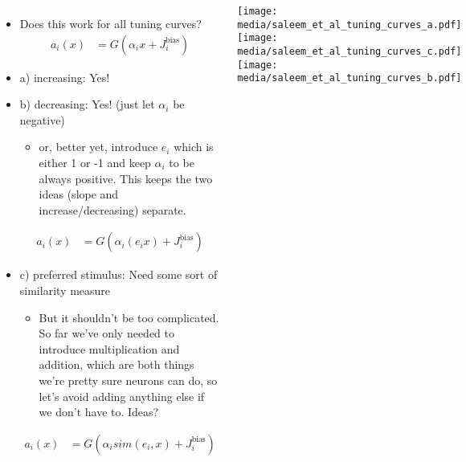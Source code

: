 \documentclass[handout,aspectratio=169]{beamer}
\begin{document}
\begin{frame}
	\begin{columns}
		\begin{itemize}
			\item Does this work for all tuning curves?
			\vspace*{-0.3cm}			
			\begin{align*}
				a_i(x) &= G(\alpha_i x + J^\mathrm{bias}_i)			
			\end{align*}			
			\item<2-> a) increasing: Yes!
			\item<3-> b) decreasing: Yes! (just let $\alpha_i$ be negative)
			\begin{itemize}
			\item or, better yet, introduce $e_i$ which is either 1 or -1 and keep $\alpha_i$ to be always positive.  This keeps the two ideas (slope and increase/decreasing) separate. 
			\end{itemize}
			\vspace*{-0.3cm}
			\begin{align*}
				a_i(x) &= G(\alpha_i (e_i x) + J^\mathrm{bias}_i)			
			\end{align*}			
			\item<4-> c) preferred stimulus: Need some sort of similarity measure
			\begin{itemize}
				\item<4-> But it shouldn't be too complicated.  So far we've only needed to introduce multiplication and addition, which are both things we're pretty sure neurons can do, so let's avoid adding anything else if we don't have to.  Ideas?
			\end{itemize} 
			\vspace*{-0.3cm}		
			\begin{align*}
				a_i(x) &= G(\alpha_i sim(e_i, x) + J^\mathrm{bias}_i)			
			\end{align*}			
		\end{itemize}
		\texttt{[image: media/saleem\_et\_al\_tuning\_curves\_a.pdf]} \\
		\texttt{[image: media/saleem\_et\_al\_tuning\_curves\_c.pdf]} \\
		\texttt{[image: media/saleem\_et\_al\_tuning\_curves\_b.pdf]}
	\end{columns}
\end{frame}
\end{document}
